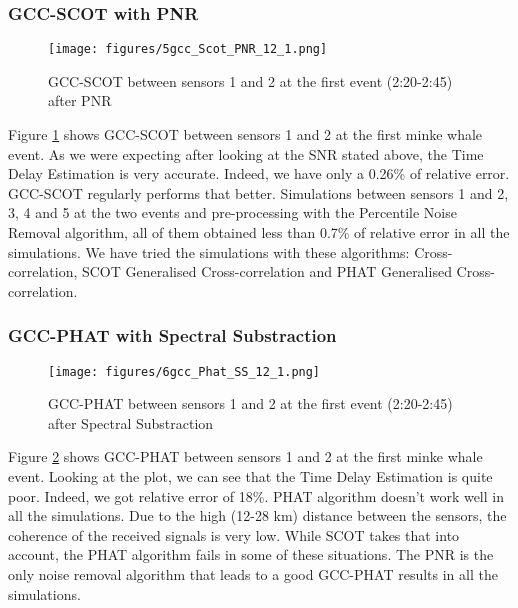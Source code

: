     \subsubsection{GCC-SCOT with PNR}

      \begin{figure}[htb]
	      \begin{center}
		      \texttt{[image: figures/5gcc\_Scot\_PNR\_12\_1.png]}
	      \end{center}
	      \caption{GCC-SCOT between sensors 1 and 2 at the first event (2:20-2:45) after PNR}
	      \label{fig:result_GCC_SCOT}
      \end{figure}
      
      Figure \ref{fig:result_GCC_SCOT} shows GCC-SCOT between sensors 1 and 2 at the first minke whale event. As we were expecting after looking at the SNR stated above, the Time Delay Estimation is very accurate. Indeed, we have only a 0.26\% of relative error. GCC-SCOT regularly performs that better. Simulations between sensors 1 and 2, 3, 4 and 5 at the two events and pre-processing with the Percentile Noise Removal algorithm, all of them obtained less than 0.7\% of relative error in all the simulations. We have tried the simulations with these algorithms: Cross-correlation, SCOT Generalised Cross-correlation and PHAT Generalised Cross-correlation.
  
    \subsubsection{GCC-PHAT with Spectral Substraction}
    
    \begin{figure}[htb]
      \begin{center}
	      \texttt{[image: figures/6gcc\_Phat\_SS\_12\_1.png]}
      \end{center}
      \caption{GCC-PHAT between sensors 1 and 2 at the first event (2:20-2:45) after Spectral Substraction}
      \label{fig:result_GCC_PHAT}
    \end{figure}
      
    Figure \ref{fig:result_GCC_PHAT} shows GCC-PHAT between sensors 1 and 2 at the first minke whale event. Looking at the plot, we can see that the Time Delay Estimation is quite poor. Indeed, we got relative error of 18\%. PHAT algorithm doesn't work well in all the simulations. Due to the high (12-28 km) distance between the sensors, the coherence of the received signals is very low. While SCOT takes that into account, the PHAT algorithm fails in some of these situations. The PNR is the only noise removal algorithm that leads to a good GCC-PHAT results in all the simulations.
